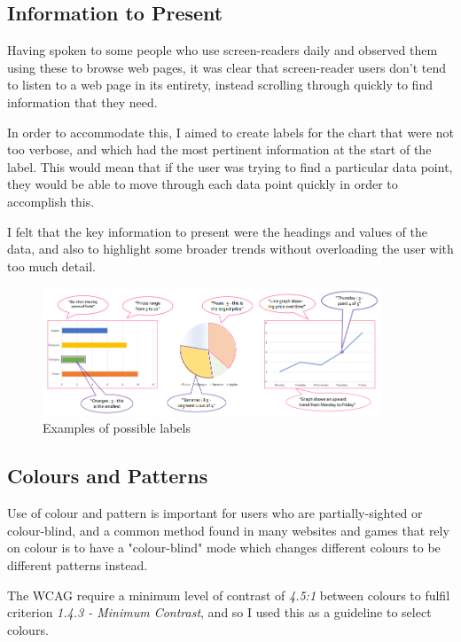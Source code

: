\documentclass[ %
                    author={Aleena Baig},
                supervisor={Dr Simon Lock},
                    degree={BSc},
                     title={On Making Web Accessible Graphs},
                  subtitle={},
                      year={2019} ]{dissertation}
\begin{document}
\subsection{Information to Present}

Having spoken to some people who use screen-readers daily and observed them using these to browse web pages, it was clear that screen-reader users don't tend to listen to a web page in its entirety, instead scrolling through quickly to find information that they need.

In order to accommodate this, I aimed to create labels for the chart that were not too verbose, and which had the most pertinent information at the start of the label. This would mean that if the user was trying to find a particular data point, they would be able to move through each data point quickly in order to accomplish this.

I felt that the key information to present were the headings and values of the data, and also to highlight some broader trends without overloading the user with too much detail.

\begin{figure}[h]
\caption{Examples of possible labels}
\centering
\includegraphics[width=0.9\textwidth]{images/GraphDesignWithReadouts.PNG}
\end{figure}

\subsection{Colours and Patterns}

Use of colour and pattern is important for users who are partially-sighted or colour-blind, and a common method found in many websites and games that rely on colour is to have a "colour-blind" mode which changes different colours to be different patterns instead.

The WCAG require a minimum level of contrast of \textit{4.5:1} between colours to fulfil criterion \textit{1.4.3 - Minimum Contrast}, and so I used this as a guideline to select colours.
\end{document}

